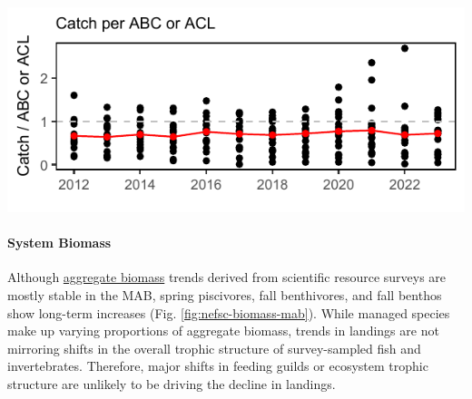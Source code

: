\documentclass[
  10pt,
]{article}
\let\origfigure\figure
\let\endorigfigure\endfigure
\renewenvironment{figure}[1][2] {
    \expandafter\origfigure\expandafter[H]
} {
    \endorigfigure
}
\begin{document}
\begin{figure}

{\centering \includegraphics{midatlantic_files/figure-latex/abcacl-catch-1} 

}

\caption{Catch divided by ABC/ACL for MAFMC managed fisheries. High points are recreational black sea bass (up to 2021) and scup (2022). Red line indicates the median ratio across all fisheries.}\label{fig:abcacl-catch}
\end{figure}

\paragraph{System Biomass}\label{system-biomass}

Although \href{https://noaa-edab.github.io/catalog/aggregate_biomass.html}{aggregate biomass} trends derived from scientific resource surveys are mostly stable in the MAB, spring piscivores, fall benthivores, and fall benthos show long-term increases (Fig. \ref{fig:nefsc-biomass-mab}). While managed species make up varying proportions of aggregate biomass, trends in landings are not mirroring shifts in the overall trophic structure of survey-sampled fish and invertebrates. Therefore, major shifts in feeding guilds or ecosystem trophic structure are unlikely to be driving the decline in landings.
\end{document}
